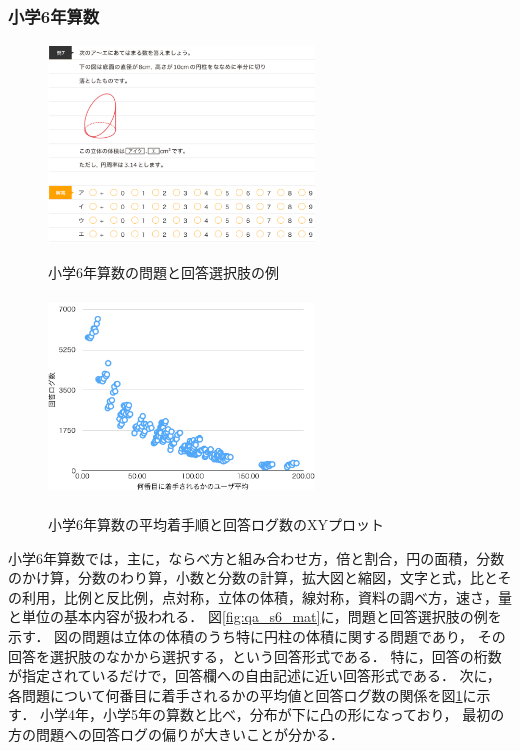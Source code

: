 \subsubsection{小学6年算数}
\begin{figure}[ht]
\begin{center}
	\includegraphics[width=200pt, height=150pt]{./img/qa_s6_mat.png}
	\caption{小学6年算数の問題と回答選択肢の例}
	\label{fig:qa_s6_mat}
\endminipage\hfill
{}
	\includegraphics[width=200pt, height=150pt]{./img/stats_s6_mat.pdf}
	\caption{小学6年算数の平均着手順と回答ログ数のXYプロット}
	\label{fig:stats_s6_mat}
\endminipage\hfill
\end{center}
\end{figure}
小学6年算数では，主に，ならべ方と組み合わせ方，倍と割合，円の面積，分数のかけ算，分数のわり算，小数と分数の計算，拡大図と縮図，文字と式，比とその利用，比例と反比例，点対称，立体の体積，線対称，資料の調べ方，速さ，量と単位の基本内容が扱われる．
図\ref{fig:qa_s6_mat}に，問題と回答選択肢の例を示す．
図の問題は立体の体積のうち特に円柱の体積に関する問題であり，
その回答を選択肢のなかから選択する，という回答形式である．
特に，回答の桁数が指定されているだけで，回答欄への自由記述に近い回答形式である．
次に，各問題について何番目に着手されるかの平均値と回答ログ数の関係を図\ref{fig:stats_s6_mat}に示す．
小学4年，小学5年の算数と比べ，分布が下に凸の形になっており，
最初の方の問題への回答ログの偏りが大きいことが分かる．


